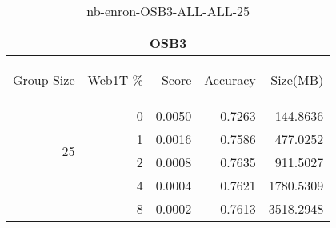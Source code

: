 \begin{center}
\begin{table}[htbp] 
 \begin{center}
\begin{tabular}{ | r | r | r | r | r |}
\hline
\multicolumn{5}{|c|}{OSB3}\\
\hline
\begin{sideways}Group Size\end{sideways} & \begin{sideways}Web1T \%\end{sideways} & \begin{sideways}Score\end{sideways} & \begin{sideways}Accuracy\end{sideways} & \begin{sideways}Size(MB)\end{sideways}\\
\hline
\multirow{4}{*}{25}
 & 0 & 0.0050 & 0.7263 & 144.8636\\ \cline{2-5}
 & 1 & 0.0016 & 0.7586 & 477.0252\\ \cline{2-5}
 & 2 & 0.0008 & 0.7635 & 911.5027\\ \cline{2-5}
 & 4 & 0.0004 & 0.7621 & 1780.5309\\ \cline{2-5}
 & 8 & 0.0002 & 0.7613 & 3518.2948\\ \cline{2-5}
\hline
\end{tabular}
\caption{nb-enron-OSB3-ALL-ALL-25}
\label{table:nb-enron-OSB3-ALL-ALL-25}
\end{center}
 \end{table}
\end{center}

